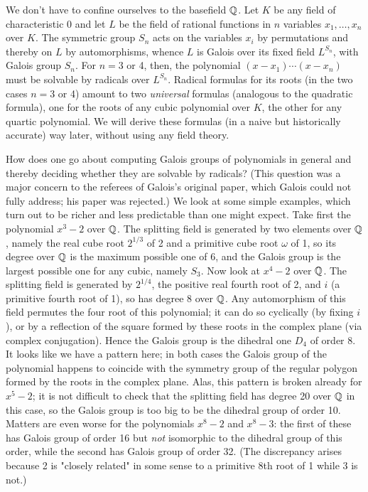 \documentclass[10pt]{article}
\begin{document}
We don't have to confine ourselves to the basefield $\Bbb Q$. Let $K$ be
any field of characteristic 0 and let $L$ be the field of rational
functions in $n$ variables $x_1,\ldots,x_n$ over $K$. The symmetric
group $S_n$ acts on the variables $x_i$ by permutations and thereby on
$L$ by automorphisms, whence $L$ is Galois over its fixed field
$L^{S_n}$, with Galois group $S_n$. For $n=3$ or 4, then, the polynomial
$(x-x_1)\cdots(x-x_n)$ must be solvable by radicals over $L^{S_n}$.
Radical formulas for its roots (in the two cases $n=3$ or 4) amount to
two {\sl universal} formulas (analogous to the quadratic formula), one
for the roots of any cubic polynomial over $K$, the other for any
quartic polynomial. We will derive these formulas (in a naive but
historically accurate) way later, without using any field theory.

How does one go about computing Galois groups of polynomials in general
and thereby deciding whether they are solvable by radicals? (This
question was a major concern to the referees of Galois's original paper,
which Galois could not fully address; his paper was rejected.) We look
at some simple examples, which turn out to be richer and less
predictable than one might expect. Take first the polynomial $x^3 - 2$
over $\Bbb Q$. The splitting field is generated by two elements over
$\Bbb Q$, namely the real cube root $2^{1/3}$ of 2 and a primitive cube
root $\omega$ of 1, so its degree over $\Bbb Q$ is the maximum possible
one of 6, and the Galois group is the largest possible one for any
cubic, namely $S_3$. Now look at $x^4 - 2$ over $\Bbb Q$. The splitting
field is generated by $2^{1/4}$, the positive real fourth root of 2, and
$i$ (a primitive fourth root of 1), so has degree 8 over $\Bbb Q$. Any
automorphism of this field permutes the four root of this polynomial; it
can do so cyclically (by fixing $i$), or by a reflection of the square
formed by these roots in the complex plane (via complex conjugation).
Hence the Galois group is the dihedral one $D_4$ of order 8. It looks
like we have a pattern here; in both cases the Galois group of the
polynomial happens to coincide with the symmetry group of the regular
polygon formed by the roots in the complex plane. Alas, this pattern is
broken already for $x^5 - 2$; it is not difficult to check that the
splitting field has degree 20 over $\Bbb Q$ in this case, so the Galois
group is too big to be the dihedral group of order 10. Matters are even
worse for the polynomials $x^8 - 2$ and $x^8 - 3$: the first of these
has Galois group of order 16 but {\sl not} isomorphic to the dihedral
group of this order, while the second has Galois group of order 32. (The
discrepancy arises because 2 is "closely related" in some sense to a
primitive 8th root of 1 while 3 is not.)
\end{document}
